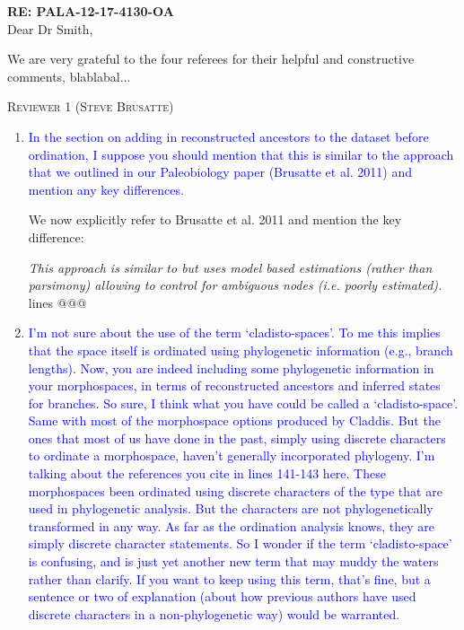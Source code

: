 \documentclass[12pt,letterpaper]{article}
\renewcommand{\section}[1]{%
\bigskip
\begin{center}
\begin{Large}
\normalfont\scshape #1
\medskip
\end{Large}
\end{center}}
\begin{document}
\textbf{RE: PALA-12-17-4130-OA}\\
\bigskip
Dear Dr Smith,\\
\bigskip

We are very grateful to the four referees for their helpful and constructive comments, blablabal...




%
%


\section{Reviewer 1 (Steve Brusatte)}

\begin{enumerate}

\item{\textcolor{blue}{In the section on adding in reconstructed ancestors to the dataset before ordination, I suppose you should mention that this is similar to the approach that we outlined in our Paleobiology paper (Brusatte et al. 2011) and mention any key differences.}}

We now explicitly refer to Brusatte et al. 2011 and mention the key difference:

\textit{This approach is similar to \cite{brusatte2011phylogenetic} but uses model based estimations (rather than parsimony) allowing to control for ambiguous nodes (i.e. poorly estimated).} lines @@@

\item{\textcolor{blue}{I’m not sure about the use of the term ‘cladisto-spaces’. To me this implies that the space itself is ordinated using phylogenetic information (e.g., branch lengths). Now, you are indeed including some phylogenetic information in your morphospaces, in terms of reconstructed ancestors and inferred states for branches. So sure, I think what you have could be called a ‘cladisto-space’. Same with most of the morphospace options produced by Claddis. But the ones that most of us have done in the past, simply using discrete characters to ordinate a morphospace, haven’t generally incorporated phylogeny. I’m talking about the references you cite in lines 141-143 here. These morphospaces been ordinated using discrete characters of the type that are used in phylogenetic analysis. But the characters are not phylogenetically transformed in any way. As far as the ordination analysis knows, they are simply discrete character statements. So I wonder if the term ‘cladisto-space’ is confusing, and is just yet another new term that may muddy the waters rather than clarify. If you want to keep using this term, that’s fine, but a sentence or two of explanation (about how previous authors have used discrete characters in a non-phylogenetic way) would be warranted.}}



\end{enumerate}
\end{document}
